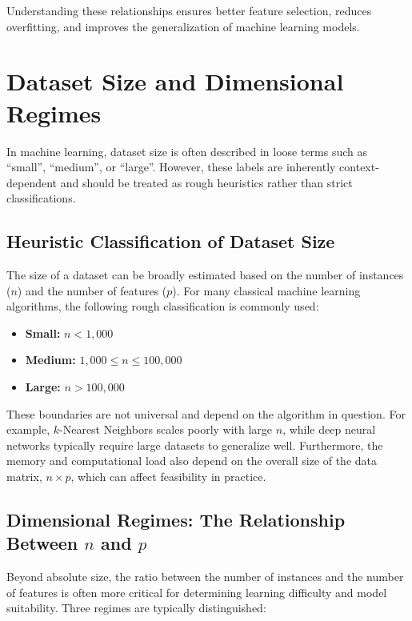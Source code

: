 \documentclass[12pt,openany]{book}
\begin{document}
Understanding these relationships ensures better feature selection, reduces overfitting, and improves the generalization of machine learning models.



\section{Dataset Size and Dimensional Regimes}

In machine learning, dataset size is often described in loose terms such as ``small'', ``medium'', or ``large''. However, these labels are inherently context-dependent and should be treated as rough heuristics rather than strict classifications.

\subsection{Heuristic Classification of Dataset Size}

The size of a dataset can be broadly estimated based on the number of instances (\(n\)) and the number of features (\(p\)). For many classical machine learning algorithms, the following rough classification is commonly used:

\begin{itemize}
    \item \textbf{Small:} \(n < 1{,}000\)
    \item \textbf{Medium:} \(1{,}000 \leq n \leq 100{,}000\)
    \item \textbf{Large:} \(n > 100{,}000\)
\end{itemize}

These boundaries are not universal and depend on the algorithm in question. For example, \(k\)-Nearest Neighbors scales poorly with large \(n\), while deep neural networks typically require large datasets to generalize well. Furthermore, the memory and computational load also depend on the overall size of the data matrix, \(n \times p\), which can affect feasibility in practice.

\subsection{Dimensional Regimes: The Relationship Between \(n\) and \(p\)}

Beyond absolute size, the ratio between the number of instances and the number of features is often more critical for determining learning difficulty and model suitability. Three regimes are typically distinguished:
\end{document}
